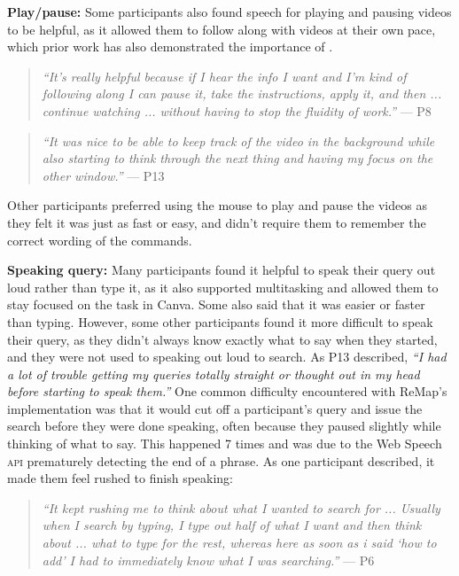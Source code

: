 \textbf{Play/pause:}
Some participants also found speech for playing and pausing videos to be helpful, as it allowed them to follow along with videos at their own pace, which prior work has also demonstrated the importance of \cite{Chang2019, Pongnumkul2011}.

\begin{quote}
\textit{``It's really helpful because if I hear the info I want and I'm kind of following along I can pause it, take the instructions, apply it, and then ... continue watching ... without having to stop the fluidity of work.''} --- P8
\end{quote}
\begin{quote}
\textit{``It was nice to be able to keep track of the video in the background while also starting to think through the next thing and having my focus on the other window.''} --- P13
\end{quote}

Other participants preferred using the mouse to play and pause the videos as they felt it was just as fast or easy, and didn't require them to remember the correct wording of the commands.

\textbf{Speaking query:}
Many participants found it helpful to speak their query out loud rather than type it, as it also supported multitasking and allowed them to stay focused on the task in Canva. Some also said that it was easier or faster than typing. However, some other participants found it more difficult to speak their query, as they didn't always know exactly what to say when they started, and they were not used to speaking out loud to search. As P13 described, \textit{``I had a lot of trouble getting my queries totally straight or thought out in my head before starting to speak them.''} One common difficulty encountered with ReMap's implementation was that it would cut off a participant's query and issue the search before they were done speaking, often because they paused slightly while thinking of what to say. This happened 7 times and was due to the Web Speech \textsc{api} prematurely detecting the end of a phrase. As one participant described, it made them feel rushed to finish speaking:

\begin{quote}
\textit{``It kept rushing me to think about what I wanted to search for ... Usually when I search by typing, I type out half of what I want and then think about ... what to type for the rest, whereas here as soon as i said `how to add' I had to immediately know what I was searching.''} --- P6
\end{quote}

